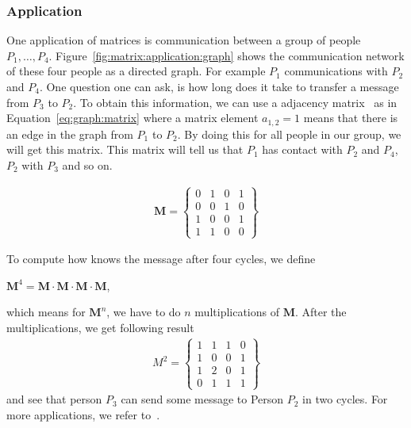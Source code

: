 \documentclass[11pt,fleqn]{book} %
\begin{document}
\subsubsection{Application}
One application of matrices is communication between a group of people $P_1,\ldots,P_4$. Figure~\ref{fig:matrix:application:graph} shows the communication network of these four people as a directed graph. For example $P_1$ communications with $P_2$ and $P_4$. One question one can ask, is how long does it take to transfer a message from $P_3$ to $P_2$. To obtain this information, we can use a adjacency matrix~\cite{biggs1993algebraic} as in Equation~\eqref{eq:graph:matrix} where a matrix element $a_{1,2}=1$ means that there is an edge in the graph from $P_1$ to $P_2$. By doing this for all people in our group, we will get this matrix. This matrix will tell us that $P_1$ has contact with $P_2$ and $P_4$, $P_2$ with $P_3$ and so on.

\begin{align}
\mathbf{M} = \left\lbrace\begin{matrix}
0 & 1 & 0 & 1 \\
0 & 0 & 1 & 0 \\
1 & 0 & 0 & 1 \\
1 & 1 & 0 & 0
\end{matrix} \right\rbrace
\label{eq:graph:matrix}
\end{align}

To compute how knows the message after four cycles, we define
\begin{center}
$\mathbf{M}^4 = \mathbf{M} \cdot \mathbf{M} \cdot \mathbf{M} \cdot \mathbf{M} $,  
\end{center}
which means for $\mathbf{M}^n$, we have to do $n$ multiplications of $\mathbf{M}$. After the multiplications, we get following result
\begin{align*}
M^2 = \left\lbrace\begin{matrix}
1 &  1 & 1 &  0 \\
1 & 0 & 0  & 1 \\
1 & 2 & 0 & 1 \\
0 & 1 & 1 & 1
\end{matrix} \right\rbrace
\end{align*}
and see that person $P_3$ can send some message to Person $P_2$ in two cycles. For more applications, we refer to~\cite{scheick1997linear}. 
\end{document}
